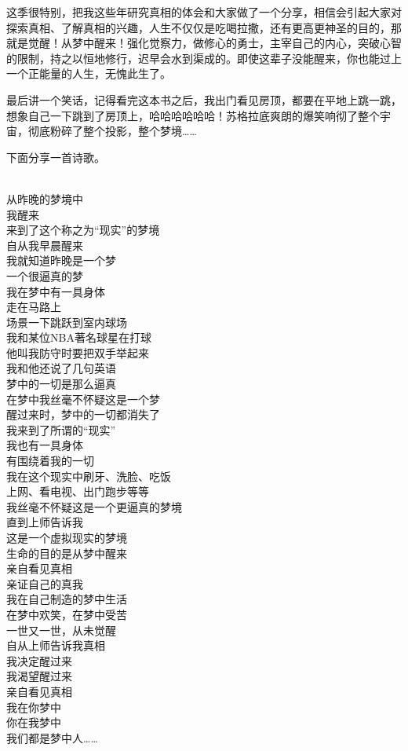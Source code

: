 这季很特别，把我这些年研究真相的体会和大家做了一个分享，相信会引起大家对探索真相、了解真相的兴趣，人生不仅仅是吃喝拉撒，还有更高更神圣的目的，那就是觉醒！从梦中醒来！强化觉察力，做修心的勇士，主宰自己的内心，突破心智的限制，持之以恒地修行，迟早会水到渠成的。即使这辈子没能醒来，你也能过上一个正能量的人生，无愧此生了。

最后讲一个笑话，记得看完这本书之后，我出门看见房顶，都要在平地上跳一跳，想象自己一下跳到了房顶上，哈哈哈哈哈哈！苏格拉底爽朗的爆笑响彻了整个宇宙，彻底粉碎了整个投影，整个梦境……

下面分享一首诗歌。

\begin{poem}[梦中人]
    \begin{multicols}{2}
        \centering~\\
        从昨晚的梦境中 \\ 我醒来 \\ 来到了这个称之为“现实”的梦境 \\ 自从我早晨醒来 \\ 我就知道昨晚是一个梦 \\ 一个很逼真的梦 \\ 我在梦中有一具身体 \\ 走在马路上 \\ 场景一下跳跃到室内球场 \\ 我和某位NBA著名球星在打球 \\ 他叫我防守时要把双手举起来 \\ 我和他还说了几句英语 \\ 梦中的一切是那么逼真 \\ 在梦中我丝毫不怀疑这是一个梦 \\ 醒过来时，梦中的一切都消失了 \\ 我来到了所谓的“现实” \\ 我也有一具身体 \\ 有围绕着我的一切 \\ 我在这个现实中刷牙、洗脸、吃饭 \\ 上网、看电视、出门跑步等等 \\ 我丝毫不怀疑这是一个更逼真的梦境 \\ 直到上师告诉我 \\ 这是一个虚拟现实的梦境 \\ 生命的目的是从梦中醒来 \\ 亲自看见真相 \\ 亲证自己的真我 \\ 我在自己制造的梦中生活 \\ 在梦中欢笑，在梦中受苦 \\ 一世又一世，从未觉醒 \\ 自从上师告诉我真相 \\ 我决定醒过来 \\ 我渴望醒过来 \\ 亲自看见真相 \\ 我在你梦中 \\ 你在我梦中 \\ 我们都是梦中人……
    \end{multicols}
\end{poem}

